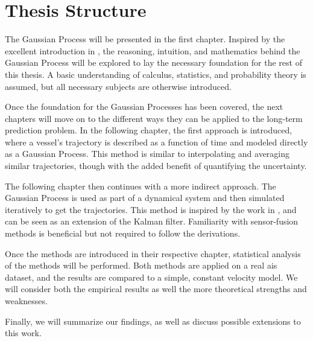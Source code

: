 
\section{Thesis Structure}
The Gaussian Process will be presented in the first chapter. Inspired by the excellent introduction in \cite{rasmussen}, the reasoning, intuition, and mathematics behind the Gaussian Process will be explored to lay the necessary foundation for the rest of this thesis. A basic understanding of calculus, statistics, and probability theory is assumed, but all necessary subjects are otherwise introduced.  

Once the foundation for the Gaussian Processes has been covered, the next chapters will move on to the different ways they can be applied to the long-term prediction problem. In the following chapter, the first approach is introduced, where a vessel's trajectory is described as a function of time and modeled directly as a Gaussian Process. This method is similar to interpolating and averaging similar trajectories, though with the added benefit of quantifying the uncertainty.

The following chapter then continues with a more indirect approach. The Gaussian Process is used as part of a dynamical system and then simulated iteratively to get the trajectories. This method is inspired by the work in \cite{pedestrian,gpekf}, and can be seen as an extension of the Kalman filter. Familiarity with sensor-fusion methods is beneficial but not required to follow the derivations.

Once the methods are introduced in their respective chapter, statistical analysis of the methods will be performed. Both methods are applied on a real \acrshort{ais} dataset, and the results are compared to a simple, constant velocity model.  We will consider both the empirical results as well the more theoretical strengths and weaknesses. 

Finally, we will summarize our findings, as well as discuss possible extensions to this work.



